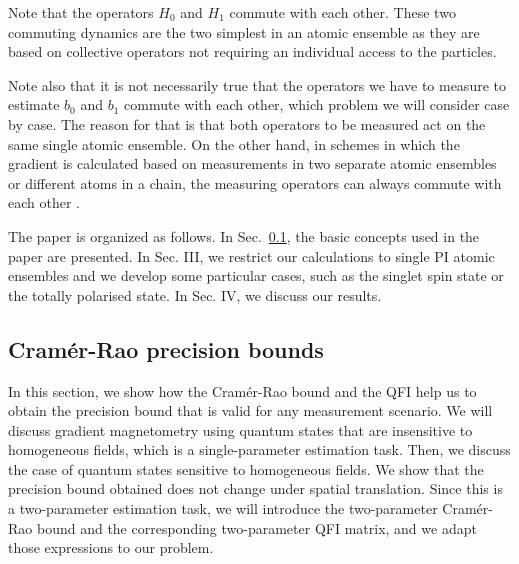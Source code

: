 Note that the operators $H_{0}$ and $H_{1}$ commute with each other.
These two commuting dynamics are the two simplest in an atomic ensemble as
they are based on collective operators not requiring an individual access to
the particles.

Note also that it is not necessarily
true that the operators we have to measure to estimate $b_0$ and $b_1$
commute with each other, which problem we will consider case by case.
The reason for that is that both operators to be measured
act on the same single atomic ensemble.
On the other hand, in schemes in which the gradient is calculated
based on measurements in two separate atomic ensembles or
different atoms in a chain, the measuring operators can always commute
with each other \cite{Wasilewski2010,Eckert2006,Zhang2014}.

The paper is organized as follows. In Sec.~\ref{sec:cramer-rao bounds}, the
basic concepts used in the paper are presented.
In Sec. III, we restrict our calculations to single PI atomic ensembles and we
develop some particular cases, such as the singlet spin state
or the totally polarised state. In Sec. IV, we discuss our results.

\subsection{Cram\'er-Rao precision bounds}
\label{sec:cramer-rao bounds}

In this section, we show how the Cram\'er-Rao bound and the QFI help us to obtain the precision bound that is valid for any measurement scenario.
We will discuss gradient magnetometry using quantum states that are insensitive to homogeneous fields, which is a single-parameter estimation task.
Then, we discuss the case of quantum states sensitive to homogeneous fields.
We show that the precision bound obtained does not change under spatial translation.
Since this is a two-parameter estimation task, we will introduce the two-parameter Cram\'er-Rao bound and the corresponding two-parameter QFI matrix, and we adapt those expressions to our problem.

